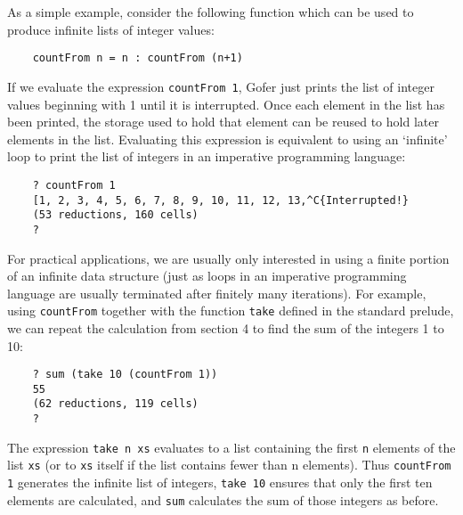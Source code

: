 As a simple example, consider the following function which can be  used
to produce infinite lists of integer values:
\begin{verbatim}
    countFrom n = n : countFrom (n+1)
\end{verbatim}
If we evaluate the expression \verb"countFrom 1", Gofer just prints the list
of integer values beginning with 1 until it is interrupted.  Once  each
element in the list has been printed, the storage  used  to  hold  that
element can be reused to hold later elements in the  list.   Evaluating
this expression is equivalent to using an `infinite' loop to print  the
list of integers in an imperative programming language:
\begin{verbatim}
    ? countFrom 1
    [1, 2, 3, 4, 5, 6, 7, 8, 9, 10, 11, 12, 13,^C{Interrupted!}
    (53 reductions, 160 cells)
    ?
\end{verbatim}
For practical applications, we are usually only interested in  using  a
finite portion of an infinite data  structure  (just  as  loops  in  an
imperative programming language are usually terminated  after  finitely
many iterations).  For example, using  \verb"countFrom"  together  with  the
function \verb"take" defined in the standard  prelude,  we  can  repeat  the
calculation from section 4 to find the sum of the integers 1 to 10:
\begin{verbatim}
    ? sum (take 10 (countFrom 1))
    55
    (62 reductions, 119 cells)
    ?
\end{verbatim}
The expression \verb"take n xs" evaluates to a list  containing  the
first \verb"n" elements of the list \verb"xs" (or to \verb"xs"
itself if the  list  contains
fewer than n elements).  Thus \verb"countFrom 1" generates the infinite list
of integers, \verb"take 10" ensures that only the  first  ten  elements  are
calculated, and \verb"sum" calculates the sum of those integers as before.


